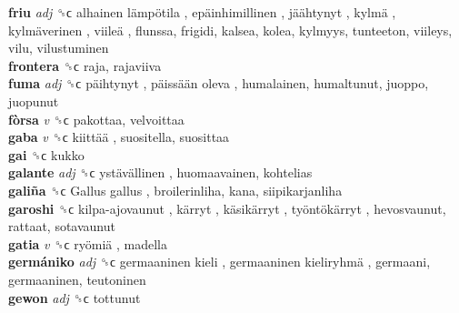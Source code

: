\textbf{friu} \emph{adj}  ␝ϲ   alhainen lämpötila ,  epäinhimillinen ,  jäähtynyt ,  kylmä ,  kylmäverinen ,  viileä , flunssa, frigidi, kalsea, kolea, kylmyys, tunteeton, viileys, vilu, vilustuminen  \\
\textbf{frontera} ␝ϲ  raja, rajaviiva  \\
\textbf{fuma} \emph{adj}  ␝ϲ   päihtynyt ,  päissään oleva , humalainen, humaltunut, juoppo, juopunut  \\
\textbf{fòrsa} \emph{v}  ␝ϲ  pakottaa, velvoittaa  \\
\textbf{gaba} \emph{v}  ␝ϲ   kiittää , suositella, suosittaa  \\
\textbf{gai} ␝ϲ  kukko  \\
\textbf{galante} \emph{adj}  ␝ϲ   ystävällinen , huomaavainen, kohtelias  \\
\textbf{galiña} ␝ϲ   Gallus gallus , broilerinliha, kana, siipikarjanliha  \\
\textbf{garoshi} ␝ϲ   kilpa-ajovaunut ,  kärryt ,  käsikärryt ,  työntökärryt , hevosvaunut, rattaat, sotavaunut  \\
\textbf{gatia} \emph{v}  ␝ϲ   ryömiä , madella  \\
\textbf{germániko} \emph{adj}  ␝ϲ   germaaninen kieli ,  germaaninen kieliryhmä , germaani, germaaninen, teutoninen  \\
\textbf{gewon} \emph{adj}  ␝ϲ  tottunut  \\
